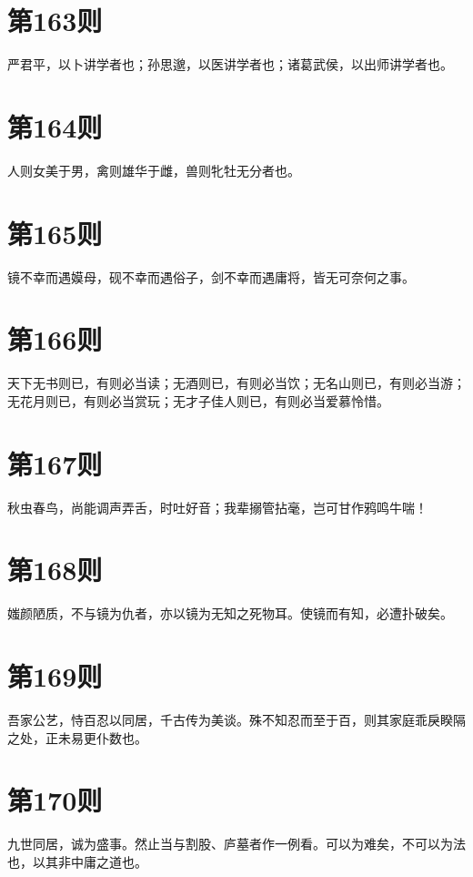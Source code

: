 \documentclass[12pt,a4paper]{ctexbook}
\begin{document}
\section{第163则}
严君平，以卜讲学者也；孙思邈，以医讲学者也；诸葛武侯，以出师讲学者也。\par

\section{第164则}
人则女美于男，禽则雄华于雌，兽则牝牡无分者也。\par

\section{第165则}
镜不幸而遇嫫母，砚不幸而遇俗子，剑不幸而遇庸将，皆无可奈何之事。\par

\section{第166则}
天下无书则已，有则必当读；无酒则已，有则必当饮；无名山则已，有则必当游；无花月则已，有则必当赏玩；无才子佳人则已，有则必当爱慕怜惜。\par

\section{第167则}
秋虫春鸟，尚能调声弄舌，时吐好音；我辈搦管拈毫，岂可甘作鸦鸣牛喘！\par

\section{第168则}
媸颜陋质，不与镜为仇者，亦以镜为无知之死物耳。使镜而有知，必遭扑破矣。\par

\section{第169则}
吾家公艺，恃百忍以同居，千古传为美谈。殊不知忍而至于百，则其家庭乖戾睽隔之处，正未易更仆数也。\par

\section{第170则}
九世同居，诚为盛事。然止当与割股、庐墓者作一例看。可以为难矣，不可以为法也，以其非中庸之道也。\par
\end{document}
